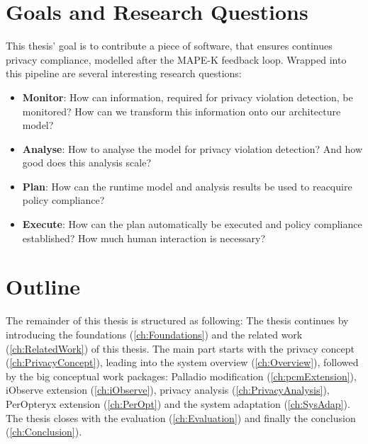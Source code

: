 %
%


\section{Goals and Research Questions}
\label{sec:Introduction:goals}

This thesis' goal is to contribute a piece of software, that ensures continues privacy compliance, modelled after the MAPE-K feedback loop. Wrapped into this pipeline are several interesting research questions:

\begin{itemize}
	\setlength\itemsep{0em}
	\item \textbf{Monitor}: How can information, required for privacy violation detection, be monitored? How can we transform this information onto our architecture model?
	\item \textbf{Analyse}: How to analyse the model for privacy violation detection? And how good does this analysis scale?
	\item \textbf{Plan}: How can the runtime model and analysis results be used to reacquire policy compliance?
	\item \textbf{Execute}: How can the plan automatically be executed and policy compliance established? How much human interaction is necessary?
\end{itemize}



\section{Outline}

The remainder of this thesis is structured as following: The thesis continues by introducing the foundations (\autoref{ch:Foundations}) and the related work (\autoref{ch:RelatedWork}) of this thesis. The main part starts with the privacy concept (\autoref{ch:PrivacyConcept}), leading into the system overview (\autoref{ch:Overview}), followed by the big conceptual work packages: Palladio modification (\autoref{ch:pcmExtension}), iObserve extension (\autoref{ch:iObserve}), privacy analysis (\autoref{ch:PrivacyAnalysis}), PerOpteryx extension (\autoref{ch:PerOpt}) and the system adaptation (\autoref{ch:SysAdap}). The thesis closes with the evaluation (\autoref{ch:Evaluation}) and finally the conclusion (\autoref{ch:Conclusion}).



